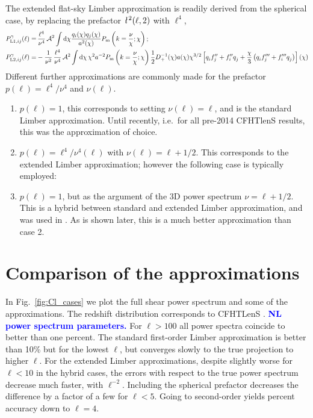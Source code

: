 \documentclass[useAMS,usenatbib]{mn2e} %
\newcommand{\ellbar}{\hbox{\it \l}\,}
\newcommand{\pref}{{\cal A}}
\newcommand{\mk}[1]{{\bf\textcolor{blue}{#1}}}
\begin{document}
The extended flat-sky Limber approximation is readily derived from the
spherical case, by replacing the prefactor $\ellbar^2(\ell, 2)$ with $\ell^4$,
%
\begin{align}
  P^\gamma_{{\rm L1}, ij}(\ell) = & \, \frac{\ell^4}{\nu^4} \, \pref^2 \int {\rm d} \chi \frac{ q_i(\chi) q_j(\chi) }{a^2(\chi)}
  P_{\rm m}\left(k = \frac{\nu}{\chi}; \chi\right);
  \label{eq:P_ell_limber1}
  \\
    P^\gamma_{{\rm L2}, ij}(\ell) = & - \frac 1 {\nu^2} \, \frac{\ell^4}{\nu^4} \, \pref^2
    \int {\rm d} \chi \, \chi^{2} a^{-2} P_{\rm m}\left(k = \frac\nu\chi; \chi\right)
    \frac 1 2 D^{-1}_+(\chi) a(\chi) \chi^{3/2} \left[ q^{}_i f^{\prime\prime}_j + f^{\prime\prime}_i q^{}_j  
      + \frac{\chi}{3} \left( q^{}_i f^{\prime\prime\prime}_j + f^{\prime\prime\prime}_i q^{}_j
      \right)
    \right](\chi)
  \label{eq:P_ell_limber2}
\end{align}
%
Different further approximations are commonly made for the prefactor $p(\ell) = \ell^4/\nu^4$ and $\nu(\ell)$.
%
\begin{enumerate}
  \item $p(\ell) = 1$, this corresponds to setting $\nu(\ell) = \ell$, and is the standard Limber approximation.
    Until recently, i.e.~for all pre-2014 CFHTlenS results, this was the approximation of choice.
  \item $p(\ell) = \ell^4/\nu^4(\ell)$ with $\nu(\ell) = \ell + 1/2$. This corresponds to the extended Limber
    approximation; however the following case is typically employed:
  \item $p(\ell) = 1$, but as the argument of the 3D power spectrum $\nu = \ell + 1/2$. This is a hybrid between
    standard and extended Limber approximation, and was used in \cite{KiDS-450,joudaki/etal:2016}. As is shown
    later, this is a much better approximation than case 2.
\end{enumerate}

\section{Comparison of the approximations}
\label{sec:comp}

In Fig.~\ref{fig:Cl_cases} we plot the full shear power spectrum and some of
the approximations. The redshift distribution corresponds to CFHTLenS
\cite{CFHTLenS-2pt-notomo}. \mk{NL power spectrum parameters.}
For $\ell > 100$ all power spectra coincide to
better than one percent. The standard first-order Limber approximation is
better than 10\% but for the lowest $\ell$, but converges slowly to the true
projection to higher $\ell$. For the extended Limber approximations, despite
slightly worse for $\ell < 10$ in the hybrid cases, the errors with respect to
the true power spectrum decrease much faster, with $\ell^{-2}$. Including the
spherical prefactor decreases the difference by a factor of a few for $\ell <
5$. Going to second-order yields percent accuracy down to $\ell = 4$.
\end{document}
